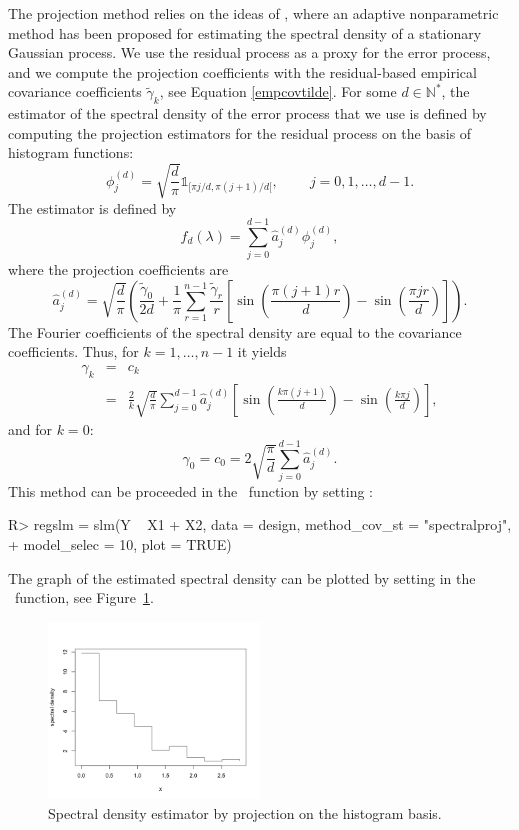 The projection method relies on the ideas of \cite{comte2001adaptive}, where an adaptive nonparametric method has been  proposed for estimating the spectral density of a stationary Gaussian process.
We use the residual process as a proxy for the error process, and we compute the projection coefficients with the residual-based empirical covariance coefficients $\tilde{\gamma}_{k}$, see Equation \eqref{empcovtilde}.
For some $d \in \mathbb N^*$, the estimator of the spectral density of the error process that we use is defined by computing the projection estimators for the residual process on the basis of histogram  functions:
\[\phi_{j}^{(d)} = \sqrt{\frac{d}{\pi}} \mathds{1}_{[\pi j/d, \pi (j+1)/d[}, \qquad   \ j = 0, 1, \ldots, d-1.\]
The estimator is defined by
\[\hat{f}_{d}(\lambda) = \sum_{j=0}^{d-1} \hat{a}_{j}^{(d)} \phi_{j}^{(d)},\]
where the projection coefficients are
\[\hat{a}_{j}^{(d)} = \sqrt{\frac{d}{\pi}} \left( \frac{\tilde{\gamma}_{0}}{2d} + \frac{1}{\pi} \sum_{r=1}^{n-1} \frac{\tilde{\gamma}_{r}}{r} \left[ \sin \left( \frac{\pi (j+1) r}{d} \right) - \sin \left( \frac{\pi j r}{d} \right) \right] \right).\]
The Fourier coefficients of the spectral density are equal to the covariance coefficients. Thus, for $k = 1, \ldots, n-1$ it yields
\begin{eqnarray*}
\gamma_k &= & c_{k} \\
&= & \frac{2}{k} \sqrt{\frac{d}{\pi}} \sum_{j=0}^{d-1} \hat{a}_{j}^{(d)} \left[ \sin \left( \frac{k \pi (j+1)}{d} \right) - \sin \left( \frac{k \pi j}{d} \right) \right],
\end{eqnarray*}
and for $k=0$:
 $$
\gamma_0 = c_{0}  =  2 \sqrt{\frac{\pi}{d}} \sum_{j=0}^{d-1} \hat{a}_{j}^{(d)}.
$$
This method can be proceeded in the \slmf~function by setting  \newline
{}:
\begin{Schunk}
\begin{Sinput}
R> regslm = slm(Y ~ X1 + X2, data = design, method_cov_st = "spectralproj", 
+  	model_selec = 10, plot = TRUE)
\end{Sinput}
\end{Schunk}
The graph of the estimated spectral density can be plotted by setting  in the \slmf~function, see Figure~\ref{fig:specdens}.

\begin{figure}[ht]
\begin{center}
\includegraphics[width=0.5\textwidth]{./figures/spec_dens5.png}
\end{center}
\caption{Spectral density estimator by projection on the histogram basis.}
\label{fig:specdens}
\end{figure}

